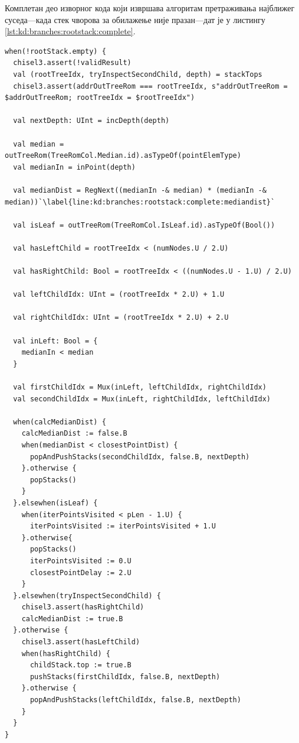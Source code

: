 \documentclass[master]{finthesis}
\begin{document}
Комплетан део изворног кода који извршава алгоритам претраживања најближег суседа---када стек чворова за обилажење није празан---дат је у листингу \ref{lst:kd:branches:rootstack:complete}.

\begin{lstlisting}[style=Chisel, caption={Потпуна реализација алгоритма претраживања најближег суседа, који се извршава када стек чворова за обилажење није празан.}, label={lst:kd:branches:rootstack:complete}]
when(!rootStack.empty) {
  chisel3.assert(!validResult)
  val (rootTreeIdx, tryInspectSecondChild, depth) = stackTops
  chisel3.assert(addrOutTreeRom === rootTreeIdx, s"addrOutTreeRom = $addrOutTreeRom; rootTreeIdx = $rootTreeIdx")

  val nextDepth: UInt = incDepth(depth)

  val median = outTreeRom(TreeRomCol.Median.id).asTypeOf(pointElemType)
  val medianIn = inPoint(depth)

  val medianDist = RegNext((medianIn -& median) * (medianIn -& median))`\label{line:kd:branches:rootstack:complete:mediandist}`

  val isLeaf = outTreeRom(TreeRomCol.IsLeaf.id).asTypeOf(Bool())

  val hasLeftChild = rootTreeIdx < (numNodes.U / 2.U)

  val hasRightChild: Bool = rootTreeIdx < ((numNodes.U - 1.U) / 2.U)

  val leftChildIdx: UInt = (rootTreeIdx * 2.U) + 1.U

  val rightChildIdx: UInt = (rootTreeIdx * 2.U) + 2.U

  val inLeft: Bool = {
    medianIn < median
  }

  val firstChildIdx = Mux(inLeft, leftChildIdx, rightChildIdx)
  val secondChildIdx = Mux(inLeft, rightChildIdx, leftChildIdx)

  when(calcMedianDist) {
    calcMedianDist := false.B
    when(medianDist < closestPointDist) {
      popAndPushStacks(secondChildIdx, false.B, nextDepth)
    }.otherwise {
      popStacks()
    }
  }.elsewhen(isLeaf) {
    when(iterPointsVisited < pLen - 1.U) {
      iterPointsVisited := iterPointsVisited + 1.U
    }.otherwise{
      popStacks()
      iterPointsVisited := 0.U
      closestPointDelay := 2.U
    }
  }.elsewhen(tryInspectSecondChild) {
    chisel3.assert(hasRightChild)
    calcMedianDist := true.B
  }.otherwise {
    chisel3.assert(hasLeftChild)
    when(hasRightChild) {
      childStack.top := true.B
      pushStacks(firstChildIdx, false.B, nextDepth)
    }.otherwise {
      popAndPushStacks(leftChildIdx, false.B, nextDepth)
    }
  }
}
\end{lstlisting}
\end{document}
